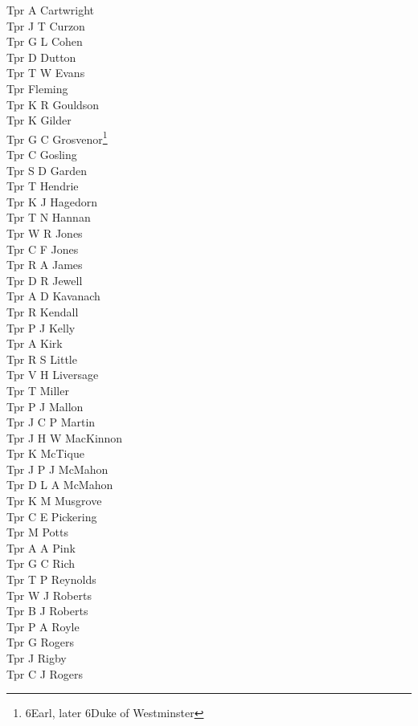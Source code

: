 \begin{multicols}{3}
  Tpr A Cartwright \\
  Tpr J T Curzon \\
  Tpr G L Cohen \\
  Tpr D Dutton \\
  Tpr T W Evans \\
  Tpr Fleming \\
  Tpr K R Gouldson \\
  Tpr K Gilder \\
  Tpr G C Grosvenor\footnote{6\nth Earl, later 6\nth Duke of Westminster} \\
  Tpr C Gosling \\
  Tpr S D Garden \\
  Tpr T Hendrie \\
  Tpr K J Hagedorn \\
  Tpr T N Hannan \\
  Tpr W R Jones \\
  Tpr C F Jones \\
  Tpr R A James \\
  Tpr D R Jewell \\
  Tpr A D Kavanach \\
  Tpr R Kendall \\
  Tpr P J Kelly \\
  Tpr A Kirk \\
  Tpr R S Little \\
  Tpr V H Liversage \\
  Tpr T Miller \\
  Tpr P J Mallon \\
  Tpr J C P Martin \\
  Tpr J H W MacKinnon \\
  Tpr K McTique \\
  Tpr J P J McMahon \\
  Tpr D L A McMahon \\
  Tpr K M Musgrove \\
  Tpr C E Pickering \\
  Tpr M Potts \\
  Tpr A A Pink \\
  Tpr G C Rich \\
  Tpr T P Reynolds \\
  Tpr W J Roberts \\
  Tpr B J Roberts \\
  Tpr P A Royle \\
  Tpr G Rogers \\
  Tpr J Rigby \\
  Tpr C J Rogers \\

\end{multicols}
